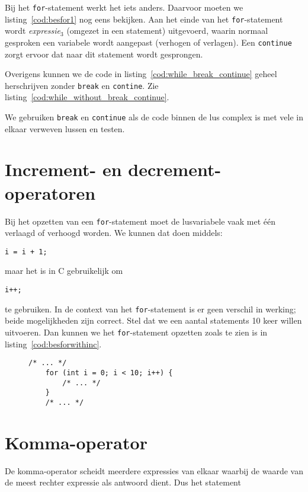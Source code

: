 Bij het \texttt{for}-statement werkt het iets anders. Daarvoor moeten we listing~\ref{cod:besfor1} nog eens bekijken. Aan het einde van het \texttt{for}-statement wordt \textsl{expressie$_3$} (omgezet in een statement) uitgevoerd, waarin normaal gesproken een variabele wordt aangepast (verhogen of verlagen). Een \texttt{continue} zorgt ervoor dat naar dit statement wordt gesprongen.


Overigens kunnen we de code in listing~\ref{cod:while_break_continue} geheel herschrijven zonder \texttt{break} en \texttt{contine}. Zie listing~\ref{cod:while_without_break_continue}.


We gebruiken \texttt{break} en \texttt{continue} als de code binnen de lus complex is met vele in elkaar verweven lussen en testen.


\section{Increment- en decrement-operatoren}
Bij het opzetten van een \texttt{for}-statement moet de lusvariabele vaak met één verlaagd of verhoogd worden. We kunnen dat doen middels:

\hspace*{1em}\texttt{i = i + 1;}

maar het is in C gebruikelijk om

\hspace*{1em}\texttt{i++;}

te gebruiken. In de context van het \texttt{for}-statement is er geen verschil in werking; beide mogelijkheden zijn correct. Stel dat we een aantal statements 10 keer willen uitvoeren. Dan kunnen we het \texttt{for}-statement opzetten zoals te zien is in listing~\ref{cod:besforwithinc}.

\begin{figure}[!ht]
\begin{lstlisting}[caption=Gebruik van de increment-operator in een \texttt{for}-statement.,label=cod:besforwithinc]
    /* ... */
    for (int i = 0; i < 10; i++) {
        /* ... */
    }
    /* ... */
\end{lstlisting}
\end{figure}


\section{Komma-operator}
\indexfunc{,}
De komma-operator scheidt meerdere expressies van elkaar waarbij de waarde van de meest rechter expressie als antwoord dient. Dus het statement

